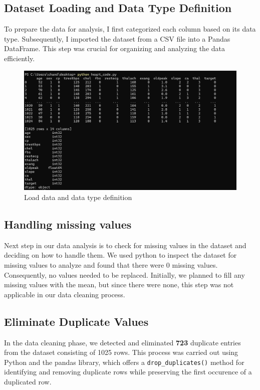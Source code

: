 \subsection{Dataset Loading and Data Type Definition}To prepare the data for analysis, I first categorized each column based on its data type. Subsequently, I imported the dataset from a CSV file into a Pandas DataFrame. This step was crucial for organizing and analyzing the data efficiently.
\begin{figure}
    \centering
    \includegraphics[width=1.0\textwidth]{figures/loaddata.png}
    \caption{Load data and data type definition}
    \label{fig:example}
\end{figure}


\subsection{Handling missing values}
Next step in our data analysis is to check for missing values in the dataset and deciding on how to handle them. We used python to inspect the dataset for missing values to analyze and found that there were 0 missing values. Consequently, no values needed to be replaced. Initially, we planned to fill any missing values with the mean, but since there were none, this step was not applicable in our data cleaning process.
\subsection{Eliminate Duplicate Values}
In the data cleaning phase, we detected and eliminated \textbf{723} duplicate entries from the dataset consisting of 1025 rows. This process was carried out using Python and the pandas library, which offers a \texttt{drop\_duplicates()} method for identifying and removing duplicate rows while preserving the first occurence of a duplicated row.

